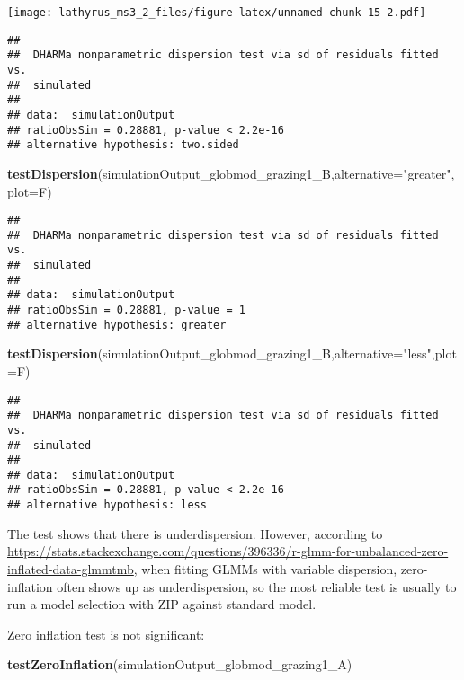 \documentclass[
]{article}
\newenvironment{Shaded}{\begin{snugshade}}{\end{snugshade}}
\newcommand{\DataTypeTok}[1]{\textcolor[rgb]{0.13,0.29,0.53}{#1}}
\newcommand{\KeywordTok}[1]{\textcolor[rgb]{0.13,0.29,0.53}{\textbf{#1}}}
\newcommand{\NormalTok}[1]{#1}
\newcommand{\StringTok}[1]{\textcolor[rgb]{0.31,0.60,0.02}{#1}}
\begin{document}
\texttt{[image: lathyrus\_ms3\_2\_files/figure-latex/unnamed-chunk-15-2.pdf]}

\begin{verbatim}
## 
##  DHARMa nonparametric dispersion test via sd of residuals fitted vs.
##  simulated
## 
## data:  simulationOutput
## ratioObsSim = 0.28881, p-value < 2.2e-16
## alternative hypothesis: two.sided
\end{verbatim}

\begin{Shaded}
\begin{Highlighting}[]
\KeywordTok{testDispersion}\NormalTok{(simulationOutput_globmod_grazing1_B,}\DataTypeTok{alternative=}\StringTok{"greater"}\NormalTok{,}\DataTypeTok{plot=}\NormalTok{F) }
\end{Highlighting}
\end{Shaded}

\begin{verbatim}
## 
##  DHARMa nonparametric dispersion test via sd of residuals fitted vs.
##  simulated
## 
## data:  simulationOutput
## ratioObsSim = 0.28881, p-value = 1
## alternative hypothesis: greater
\end{verbatim}

\begin{Shaded}
\begin{Highlighting}[]
\KeywordTok{testDispersion}\NormalTok{(simulationOutput_globmod_grazing1_B,}\DataTypeTok{alternative=}\StringTok{"less"}\NormalTok{,}\DataTypeTok{plot=}\NormalTok{F) }
\end{Highlighting}
\end{Shaded}

\begin{verbatim}
## 
##  DHARMa nonparametric dispersion test via sd of residuals fitted vs.
##  simulated
## 
## data:  simulationOutput
## ratioObsSim = 0.28881, p-value < 2.2e-16
## alternative hypothesis: less
\end{verbatim}

The test shows that there is underdispersion. However, according to
\url{https://stats.stackexchange.com/questions/396336/r-glmm-for-unbalanced-zero-inflated-data-glmmtmb},
when fitting GLMMs with variable dispersion, zero-inflation often shows
up as underdispersion, so the most reliable test is usually to run a
model selection with ZIP against standard model.

Zero inflation test is not significant:

\begin{Shaded}
\begin{Highlighting}[]
\KeywordTok{testZeroInflation}\NormalTok{(simulationOutput_globmod_grazing1_A)}
\end{Highlighting}
\end{Shaded}
\end{document}
